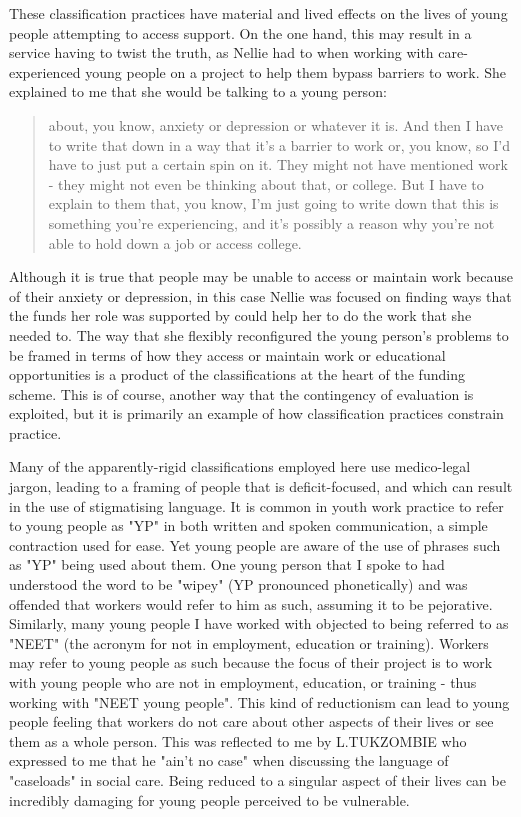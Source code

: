 These classification practices have material and lived effects on the lives of young people attempting to access support. On the one hand, this may result in a service having to twist the truth, as Nellie had to when working with care-experienced young people on a project to help them bypass barriers to work. She explained to me that she would be talking to a young person:
\begin{quote}
about, you know, anxiety or depression or whatever it is. And then I have to write that down in a way that it's a barrier to work or, you know, so I'd have to just put a certain spin on it. They might not have mentioned work - they might not even be thinking about that, or college. But I have to explain to them that, you know, I'm just going to write down that this is something you're experiencing, and it's possibly a reason why you're not able to hold down a job or access college.
\end{quote}
Although it is true that people may be unable to access or maintain work because of their anxiety or depression, in this case Nellie was focused on finding ways that the funds her role was supported by could help her to do the work that she needed to. The way that she flexibly reconfigured the young person's problems to be framed in terms of how they access or maintain work or educational opportunities is a product of the classifications at the heart of the funding scheme. This is of course, another way that the contingency of evaluation is exploited, but it is primarily an example of how classification practices constrain practice.

Many of the apparently-rigid classifications employed here use medico-legal jargon, leading to a framing of people that is deficit-focused, and which can result in the use of stigmatising language. It is common in youth work practice to refer to young people as "YP" in both written and spoken communication, a simple contraction used for ease. Yet young people are aware of the use of phrases such as "YP" being used about them. One young person that I spoke to had understood the word to be "wipey" (YP pronounced phonetically) and was offended that workers would refer to him as such, assuming it to be pejorative. Similarly, many young people I have worked with objected to being referred to as "NEET" (the acronym for not in employment, education or training). Workers may refer to young people as such because the focus of their project is to work with young people who are not in employment, education, or training - thus working with "NEET young people". This kind of reductionism can lead to young people feeling that workers do not care about other aspects of their lives or see them as a whole person. This was reflected to me by L.TUKZOMBIE who expressed to me that he "ain't no case" when discussing the language of "caseloads" in social care. Being reduced to a singular aspect of their lives can be incredibly damaging for young people perceived to be vulnerable.  

